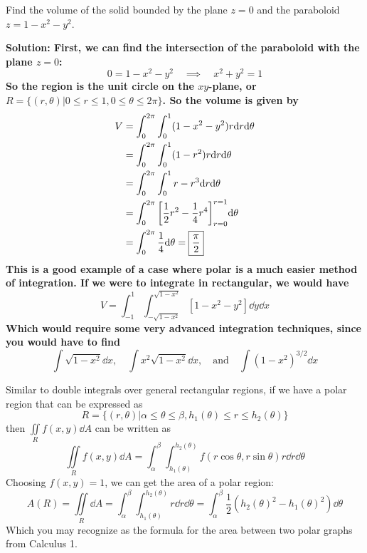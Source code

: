 \begin{example}
    Find the volume of the solid bounded by the plane \( z=0 \) and the paraboloid \( z=1-x^2-y^2 \). \par\bf{Solution}: 
    First, we can find the intersection of the paraboloid with the plane \( z=0 \):
    \[ 0 = 1-x^2-y^2 \quad\implies\quad x^2+y^2=1\]
    So the region is the unit circle on the \( xy \)-plane, or \( R = \{(r, \theta)|0\leq r\leq 1, 0\leq\theta\leq 2\pi\} \). So the volume is given by
    \begin{align*}
        V &= \int_0^{2\pi}\int_0^1(1-x^2-y^2)r\dd r\dd \theta \\
        &= \int_0^{2\pi}\int_0^1 (1-r^2)r\dd r\dd\theta \\
        &= \int_0^{2\pi}\int_0^1 r-r^3\dd r\dd \theta \\
        &= \int_0^{2\pi}\bqty{\frac{1}{2}r^2-\frac{1}{4}r^4}_{r=0}^{r=1}\dd \theta \\
        &= \int_0^{2\pi}\frac{1}{4}\dd \theta = \boxed{\frac{\pi}{2}}
    \end{align*}
    This is a good example of a case where polar is a much easier method of integration. If we were to integrate in rectangular, we would have
    \[ V = \int_{-1}^1\int_{-\sqrt{1-x^2}}^{\sqrt{1-x^2}}[1-x^2-y^2]\dd y\dd x \]
    Which would require some very advanced integration techniques, since you would have to find 
    \[ \int \sqrt{1-x^2}\dd x, \quad \int x^2\sqrt{1-x^2}\dd x,\quad\text{and}\quad \int(1-x^2)^{3/2}\dd x \]
\end{example}
Similar to double integrals over general rectangular regions, if we have a polar region that can be expressed as 
\[ R = \{(r, \theta)| \alpha\leq \theta \leq \beta, h_1(\theta)\leq r\leq h_2(\theta)\}\]
then \( \iint\limits_Rf(x,y)\dd A \) can be written as 
\[ \iint\limits_Rf(x,y)\dd A = \int_\alpha^\beta\int_{h_1(\theta)}^{h_2(\theta)} f(r\cos\theta, r\sin\theta)r\dd r \dd \theta\]
Choosing \( f(x,y)=1 \), we can get the area of a polar region:
\[ A(R) = \iint\limits_R\dd A =\int_{\alpha}^{\beta}\int_{h_1(\theta)}^{h_2(\theta)}r\dd r\dd \theta = \int_{\alpha}^{\beta}\frac{1}{2}(h_2(\theta)^2-h_1(\theta)^2)\dd \theta\]
Which you may recognize as the formula for the area between two polar graphs from Calculus 1. 
